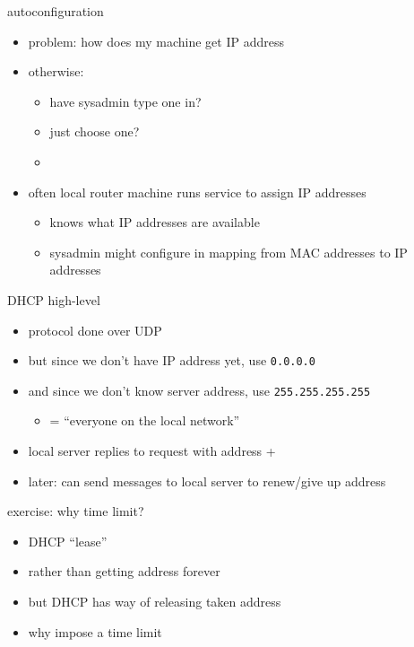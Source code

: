 
\begin{frame}{autoconfiguration}
\begin{itemize}
\item problem: how does my machine get IP address
\vspace{.5cm}
\item otherwise:
    \begin{itemize}
    \item have sysadmin type one in?
    \item just choose one?
    \item {}
    \end{itemize}
\vspace{.5cm}
\item<3-> often local router machine runs service to assign IP addresses
    \begin{itemize}
    \item knows what IP addresses are available
    \item sysadmin might configure in mapping from MAC addresses to IP addresses
    \end{itemize}
\end{itemize}
\end{frame}

\begin{frame}{DHCP high-level}
    \begin{itemize}
    \item protocol done over UDP
    \vspace{.5cm}
    \item but since we don't have IP address yet, use \texttt{0.0.0.0}
    \item and since we don't know server address, use \texttt{255.255.255.255}
        \begin{itemize}
        \item = ``everyone on the local network''
        \end{itemize}
    \item local server replies to request with address + 
    \item later: can send messages to local server to renew/give up address
    \end{itemize}
\end{frame}

\begin{frame}{exercise: why time limit?}
    \begin{itemize}
        \item DHCP ``lease''
        \item rather than getting address forever
        \vspace{.5cm}
        \item but DHCP has way of releasing taken address
        \vspace{.5cm}
        \item why impose a time limit
    \end{itemize}
\end{frame}

